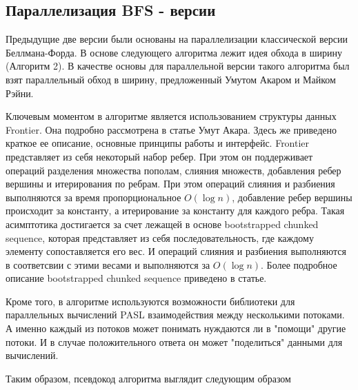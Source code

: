 \FloatBarrier
\subsection{Параллелизация BFS - версии}
Предыдущие две версии были основаны на параллелизации классической версии Беллмана-Форда. В основе следующего алгоритма лежит идея обхода в ширину (Алгоритм 2). В качестве основы для параллельной версии такого алгоритма был взят параллельный обход в ширину, предложенный Умутом Акаром и Майком Рэйни. 


Ключевым моментом в алгоритме является использованием структуры данных Frontier. Она подробно рассмотрена в статье Умут Акара. Здесь же приведено краткое ее описание, основные принципы работы и интерфейс. Frontier представляет из себя некоторый набор ребер. При этом он поддерживает операций разделения множества пополам, слияния множеств, добавления ребер вершины и итерирования по ребрам. При этом  операций слияния и разбиения выполняются за время пропорциональное $O(\log n)$, добавление ребер вершины происходит за константу, а итерирование за константу для каждого ребра. Такая асимптотика достигается за счет лежащей в основе bootstrapped chunked sequence, которая представляет из себя последовательность, где каждому элементу сопоставляется его вес. И операций слияния и разбиения выполняются в соответсвии с этими весами и выполняются за $O(\log n)$. Более подробное описание bootstrapped chunked sequence приведено в статье. 

Кроме того, в алгоритме используются возможности библиотеки для параллельных вычислений PASL взаимодействия между несколькими потоками. А именно каждый из потоков может понимать нуждаются ли в "помощи" другие потоки. И в случае положительного ответа он может "поделиться" данными для вычислений. 

Таким образом, псевдокод алгоритма выглядит следующим образом


